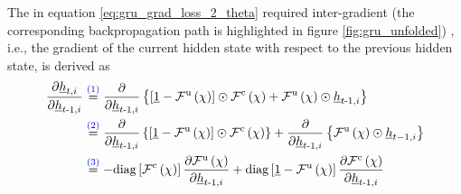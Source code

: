 The in equation \ref{eq:gru_grad_loss_2_theta} required inter-gradient
(the corresponding backpropagation path is highlighted in figure \ref{fig:gru_unfolded})
, i.e., 
the gradient of the current hidden state with respect to the previous hidden state,
is derived as
\begin{align} \label{eq:gru_grad_inter}
    \frac{\partial \underline h_{t, i}}{\partial \underline h_{t\text{-}1, i}}
    &\overset{\textcolor{blue}{(1)}}{=}
    \frac{\partial}{\partial \underline h_{t\text{-}1, i}} \left\{
        \left[
            \underline 1 
            -
            \mathcal{F}^\text{u}\left(\chi\right)
        \right]
        \odot
        \mathcal{F}^\text{c} \left(\chi\right)
        +
        \mathcal{F}^\text{u}\left(\chi\right)
        \odot
        \underline h_{t\text -1,i}
    \right\}
    \nonumber \\ &\overset{\textcolor{blue}{(2)}}{=}
    \frac{\partial}{\partial \underline h_{t\text{-}1, i}} \left\{
        \left[
            \underline 1 
            -
            \mathcal{F}^\text{u}\left(\chi\right)
        \right]
        \odot
        \mathcal{F}^\text{c} \left(\chi\right)
    \right\}
    +
    \frac{\partial}{\partial \underline h_{t\text{-}1, i}} \left\{
        \mathcal{F}^\text{u}\left(\chi\right)
        \odot
        \underline h_{t-1,i}
    \right\}
    \nonumber \\ & \overset{\textcolor{blue}{(3)}}{=}
    - \mathrm{diag}\left[\mathcal{F}^\text{c} \left(\chi\right)\right] 
    \frac{\partial \mathcal{F}^\text{u}\left(\chi\right)}
        {\partial \underline h_{t\text{-}1, i}}
    +
    \mathrm{diag} \left[
        \underline 1 
        -
        \mathcal{F}^\text{u}\left(\chi\right)
    \right]
    \frac{\partial \mathcal{F}^\text{c} \left(\chi\right)}
        {\partial \underline h_{t\text{-}1, i}}

\end{align}
